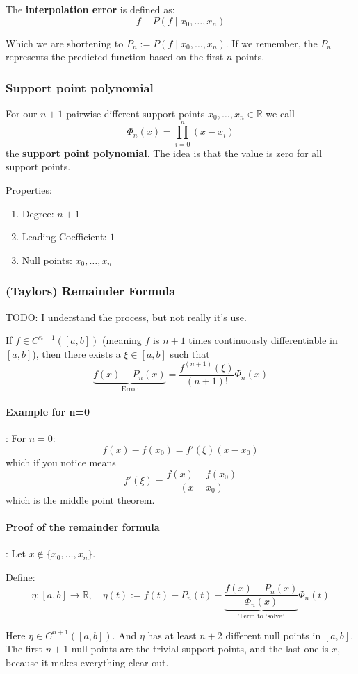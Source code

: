 \documentclass{article}
\begin{document}
The \textbf{interpolation error} is defined as: 
\[f - P(f \mid x_0,\dots,x_n)\]

Which we are shortening to $P_n := P(f \mid x_0,\dots,x_n)$. If we remember, the $P_n$ represents the predicted function based on the first $n$ points.

\subsubsection{Support point polynomial}
For our $n+1$ pairwise different support points $x_0,\dots,x_n \in \mathbb{R}$ we call
\[\Phi_n(x) = \prod_{i=0}^n(x-x_i)\]
the \textbf{support point polynomial}. The idea is that the value is zero for all support points.

Properties:
\begin{enumerate}
  \item Degree: $n+1$
  \item Leading Coefficient: $1$
  \item Null points: $x_0,\dots,x_n$
\end{enumerate}

\subsubsection{(Taylors) Remainder Formula}
TODO: I understand the process, but not really it's use.

If $f \in C^{n+1}([a,b])$ (meaning $f$ is $n+1$ times continuously differentiable in $[a,b]$), then there exists a $\xi \in [a,b]$ such that
\[\underbrace{f(x) - P_n(x)}_{\text{Error}} = \frac{f^{(n+1)}(\xi)}{(n+1)!}\Phi_n(x)\]

\paragraph{Example for n=0}: For $n=0$:
\[f(x) - f(x_0) = f'(\xi)(x-x_0)\]
which if you notice means
\[f'(\xi) = \frac{f(x)-f(x_0)}{(x-x_0)}\]
which is the middle point theorem.

\paragraph{Proof of the remainder formula}: Let $x\notin \{x_0,\dots,x_n\}$.

Define:
\[\eta : [a,b] \to\mathbb{R} , \quad \eta(t) := f(t)-P_n(t) - \underbrace{\frac{f(x)-P_n(x)}{\Phi_n(x)}}_{\text{Term to 'solve'}}\Phi_n(t)\]

Here $\eta \in C^{n+1}([a,b])$. And $\eta$ has at least $n+2$ different null points in $[a,b]$. The first $n+1$ null points are the trivial support points, and the last one is $x$, because it makes everything clear out.
\end{document}
